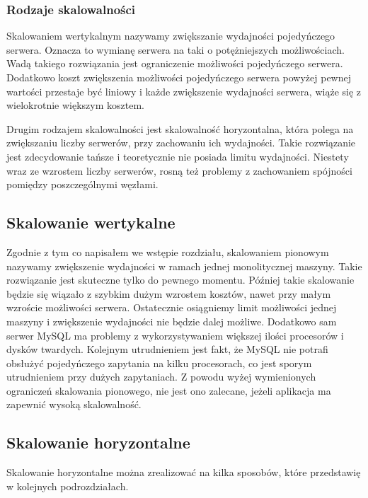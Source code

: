 \subsubsection{Rodzaje skalowalności}
Skalowaniem wertykalnym nazywamy zwiększanie wydajności pojedyńczego serwera. Oznacza to wymianę serwera na taki o potężniejszych możliwościach. Wadą takiego rozwiązania jest ograniczenie możliwości pojedyńczego serwera. Dodatkowo koszt zwiększenia możliwości pojedyńczego serwera powyżej pewnej wartości przestaje być liniowy i każde zwiększenie wydajności serwera, wiąże się z wielokrotnie większym kosztem.

Drugim rodzajem skalowalności jest skalowalność horyzontalna, która polega na zwiększaniu liczby serwerów, przy zachowaniu ich wydajności. Takie rozwiązanie jest zdecydowanie tańsze i teoretycznie nie posiada limitu wydajności. Niestety wraz ze wzrostem liczby serwerów, rosną też problemy z zachowaniem spójności pomiędzy poszczególnymi węzłami.

\subsection{Skalowanie wertykalne}
Zgodnie z tym co napisałem we wstępie rozdziału, skalowaniem pionowym nazywamy zwiększenie wydajności w ramach jednej monolitycznej maszyny. Takie rozwiązanie jest skuteczne tylko do pewnego momentu. Później takie skalowanie będzie się wiązało z szybkim dużym wzrostem kosztów, nawet przy małym wzroście możliwości serwera. Ostatecznie osiągniemy limit możliwości jednej maszyny i zwiększenie wydajności nie będzie dalej możliwe. Dodatkowo sam serwer MySQL ma problemy z wykorzystywaniem większej ilości procesorów i dysków twardych. Kolejnym utrudnieniem jest fakt, że MySQL nie potrafi obsłużyć pojedyńczego zapytania na kilku procesorach, co jest sporym utrudnieniem przy dużych zapytaniach. Z powodu wyżej wymienionych ograniczeń skalowania pionowego, nie jest ono zalecane, jeżeli aplikacja ma zapewnić wysoką skalowalność.

\subsection{Skalowanie horyzontalne}
Skalowanie horyzontalne można zrealizować na kilka sposobów, które przedstawię w kolejnych podrozdziałach.
